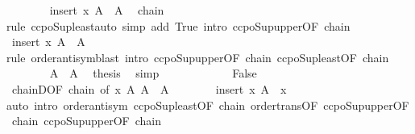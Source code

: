 \begin{isabellebody}
\ \ \ \ \ \ \isamarkupfalse%
\ {\isachardoublequoteopen}{\isasymSqunion}{\isacharparenleft}{\kern0pt}insert\ x\ A{\isacharparenright}{\kern0pt}\ {\isasymle}\ {\isasymSqunion}A{\isachardoublequoteclose}\ \isamarkupfalse%
\ chain\isanewline
\ \ \ \ \ \ \ \ \isamarkupfalse%
{\isacharparenleft}{\kern0pt}rule\ ccpo{\isacharunderscore}{\kern0pt}Sup{\isacharunderscore}{\kern0pt}least{\isacharparenright}{\kern0pt}{\isacharparenleft}{\kern0pt}auto\ simp\ add{\isacharcolon}{\kern0pt}\ True\ intro{\isacharcolon}{\kern0pt}\ ccpo{\isacharunderscore}{\kern0pt}Sup{\isacharunderscore}{\kern0pt}upper{\isacharbrackleft}{\kern0pt}OF\ chain{\isacharprime}{\kern0pt}{\isacharbrackright}{\kern0pt}{\isacharparenright}{\kern0pt}\isanewline
\ \ \ \ \ \ \isamarkupfalse%
\ {\isachardoublequoteopen}{\isasymSqunion}{\isacharparenleft}{\kern0pt}insert\ x\ A{\isacharparenright}{\kern0pt}\ {\isacharequal}{\kern0pt}\ {\isasymSqunion}A{\isachardoublequoteclose}\isanewline
\ \ \ \ \ \ \ \ \isamarkupfalse%
{\isacharparenleft}{\kern0pt}rule\ order{\isachardot}{\kern0pt}antisym{\isacharparenright}{\kern0pt}{\isacharparenleft}{\kern0pt}blast\ intro{\isacharcolon}{\kern0pt}\ ccpo{\isacharunderscore}{\kern0pt}Sup{\isacharunderscore}{\kern0pt}upper{\isacharbrackleft}{\kern0pt}OF\ chain{\isacharbrackright}{\kern0pt}\ ccpo{\isacharunderscore}{\kern0pt}Sup{\isacharunderscore}{\kern0pt}least{\isacharbrackleft}{\kern0pt}OF\ chain{\isacharprime}{\kern0pt}{\isacharbrackright}{\kern0pt}{\isacharparenright}{\kern0pt}\isanewline
\ \ \ \ \ \ \isamarkupfalse%
\ {\isacartoucheopen}{\isasymSqunion}A\ {\isasymin}\ A{\isacartoucheclose}\ \isamarkupfalse%
\ {\isacharquery}{\kern0pt}thesis\ \isamarkupfalse%
\ simp\isanewline
\ \ \ \ \isamarkupfalse%
\isanewline
\ \ \ \ \ \ \isamarkupfalse%
\ False\isanewline
\ \ \ \ \ \ \isamarkupfalse%
\ chainD{\isacharbrackleft}{\kern0pt}OF\ chain{\isacharcomma}{\kern0pt}\ of\ x\ {\isachardoublequoteopen}{\isasymSqunion}A{\isachardoublequoteclose}{\isacharbrackright}{\kern0pt}\ {\isacartoucheopen}{\isasymSqunion}A\ {\isasymin}\ A{\isacartoucheclose}\isanewline
\ \ \ \ \ \ \isamarkupfalse%
\ {\isachardoublequoteopen}{\isasymSqunion}{\isacharparenleft}{\kern0pt}insert\ x\ A{\isacharparenright}{\kern0pt}\ {\isacharequal}{\kern0pt}\ x{\isachardoublequoteclose}\isanewline
\ \ \ \ \ \ \ \ \isamarkupfalse%
{\isacharparenleft}{\kern0pt}auto\ intro{\isacharcolon}{\kern0pt}\ order{\isachardot}{\kern0pt}antisym\ ccpo{\isacharunderscore}{\kern0pt}Sup{\isacharunderscore}{\kern0pt}least{\isacharbrackleft}{\kern0pt}OF\ chain{\isacharbrackright}{\kern0pt}\ order{\isacharunderscore}{\kern0pt}trans{\isacharbrackleft}{\kern0pt}OF\ ccpo{\isacharunderscore}{\kern0pt}Sup{\isacharunderscore}{\kern0pt}upper{\isacharbrackleft}{\kern0pt}OF\ chain{\isacharprime}{\kern0pt}{\isacharbrackright}{\kern0pt}{\isacharbrackright}{\kern0pt}\ ccpo{\isacharunderscore}{\kern0pt}Sup{\isacharunderscore}{\kern0pt}upper{\isacharbrackleft}{\kern0pt}OF\ chain{\isacharbrackright}{\kern0pt}{\isacharparenright}{\kern0pt}\isanewline

\end{isabellebody}

